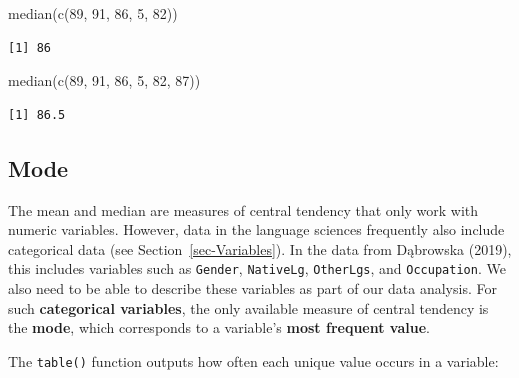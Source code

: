 \documentclass[
  letterpaper,
  DIV=11,
  numbers=noendperiod]{scrreprt}
\newenvironment{Shaded}{\begin{snugshade}}{\end{snugshade}}
\newcommand{\DecValTok}[1]{\textcolor[rgb]{0.68,0.00,0.00}{#1}}
\newcommand{\FunctionTok}[1]{\textcolor[rgb]{0.28,0.35,0.67}{#1}}
\newcommand{\NormalTok}[1]{\textcolor[rgb]{0.00,0.23,0.31}{#1}}
\newcommand{\SpecialCharTok}[1]{\textcolor[rgb]{0.37,0.37,0.37}{#1}}
\begin{document}
\begin{Shaded}
\begin{Highlighting}[]
\FunctionTok{median}\NormalTok{(}\FunctionTok{c}\NormalTok{(}\DecValTok{89}\NormalTok{, }\DecValTok{91}\NormalTok{, }\DecValTok{86}\NormalTok{, }\DecValTok{5}\NormalTok{, }\DecValTok{82}\NormalTok{))}
\end{Highlighting}
\end{Shaded}

\begin{verbatim}
[1] 86
\end{verbatim}

\begin{Shaded}
\begin{Highlighting}[]
\FunctionTok{median}\NormalTok{(}\FunctionTok{c}\NormalTok{(}\DecValTok{89}\NormalTok{, }\DecValTok{91}\NormalTok{, }\DecValTok{86}\NormalTok{, }\DecValTok{5}\NormalTok{, }\DecValTok{82}\NormalTok{, }\DecValTok{87}\NormalTok{))}
\end{Highlighting}
\end{Shaded}

\begin{verbatim}
[1] 86.5
\end{verbatim}

\subsection{Mode}\label{sec-Mode}

The mean and median are measures of central tendency that only work with
numeric variables. However, data in the language sciences frequently
also include categorical data (see Section~\ref{sec-Variables}). In the
data from Dąbrowska (2019), this includes variables such as
\texttt{Gender}, \texttt{NativeLg}, \texttt{OtherLgs}, and
\texttt{Occupation}. We also need to be able to describe these variables
as part of our data analysis. For such \textbf{categorical variables},
the only available measure of central tendency is the \textbf{mode},
which corresponds to a variable's \textbf{most frequent value}.

The \texttt{table()} function outputs how often each unique value occurs
in a variable:

\begin{Shaded}
\end{Shaded}
\end{document}
